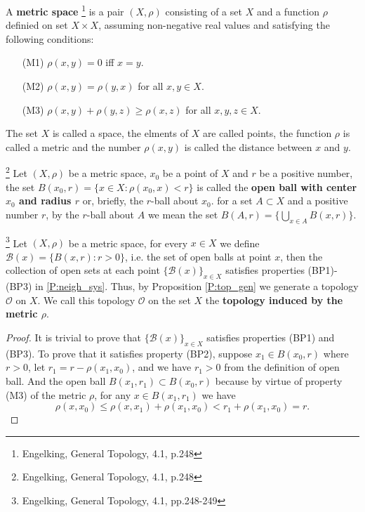 \begin{definition} \label{D:metric}
A \textbf{metric space}
\footnote{Engelking, General Topology, 4.1, p.248}
is a pair $(X,\rho)$ consisting of a set $X$ and a function $\rho$
definied on set $X\times X$, assuming non-negative real values and satisfying
the following conditions:
\begin{enumerate}
  \item[(M1)] $\rho(x,y)=0$ iff $x=y$.
  \item[(M2)] $\rho(x,y)=\rho(y,x)$ for all $x,y\in X$.
  \item[(M3)] $\rho(x,y)+\rho(y,z)\ge \rho(x,z)$ for all $x,y,z\in X$.
\end{enumerate}
The set $X$ is called a space, the elments of $X$ are called points, the
function $\rho$ is called a metric and the number $\rho(x,y)$ is called the distance
between $x$ and $y$.
\end{definition}


\begin{definition}
\footnote{Engelking, General Topology, 4.1, p.248}
Let $(X,\rho)$ be a metric space, $x_0$ be a point of $X$ and $r$ be a positive
number, the set $B(x_0,r)=\{x\in X: \rho(x_0,x)<r\}$ is called the 
\textbf{open ball with center $x_0$ and radius $r$} 
or, briefly, the $r$-ball
about $x_0$. for a set $A\subset X$ and a positive number $r$, by the $r$-ball
about $A$ we mean the set $B(A,r)=\{\bigcup_{x\in A} B(x,r)\}$.
\end{definition}


\begin{lemma} \label{L:top_metric}
\footnote{Engelking, General Topology, 4.1, pp.248-249}
Let $(X,\rho)$ be a metric space, 
for every $x\in X$ we define $\mathcal{B}(x)=\{B(x,r):r>0\}$, i.e. the
set of open balls at point $x$, then the collection of open sets at each point
$\{\mathcal{B}(x)\}_{x\in X}$ satisfies properties (BP1)-(BP3) in 
\ref{P:neigh_sys}. 
Thus, by Proposition \ref{P:top_gen} we generate a topology
$\mathcal{O}$ on $X$. We call this topology $\mathcal{O}$ on the set $X$ the
\textbf{topology induced by the metric $\rho$}.
\end{lemma}
\begin{proof}
It is trivial to prove that $\{\mathcal{B}(x)\}_{x\in X}$ satisfies properties
(BP1) and (BP3). To prove that it satisfies property (BP2), suppose 
$x_1\in B(x_0,r)$ where $r>0$, let $r_1=r-\rho(x_1,x_0)$, and we have $r_1>0$ 
from the definition of open ball. And the open ball $B(x_1,r_1)\subset B(x_0,r)$
because by virtue of property (M3) of the metric $\rho$, for any 
$x\in B(x_1,r_1)$ we have
\[
  \rho(x,x_0) \le \rho(x,x_1)+\rho(x_1,x_0) < r_1+\rho(x_1,x_0) = r.
\]
\end{proof}


